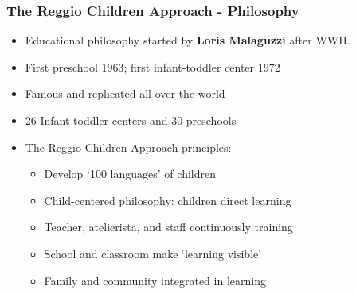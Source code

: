 \documentclass{beamer}
\begin{document}
\begin{frame}
\frametitle{The Reggio Children Approach - Philosophy}\label{frame:philosphy}
\begin{itemize}
	\item Educational philosophy started by \textbf{Loris Malaguzzi} after WWII.
	\item First preschool 1963; first infant-toddler center 1972 \hyperlink{fig:Num_Nidi}{}
	\item Famous and replicated all over the world \hyperlink{fig:World}{}
	\item 26 Infant-toddler centers and 30 preschools

	\vspace{2ex}


	\item The Reggio Children Approach principles:
		\begin{itemize}
		\item Develop `100 languages' of children
		\item Child-centered philosophy: children direct learning
		\item Teacher, atelierista, and staff continuously training
		\item School and classroom make `learning visible'
		\item Family and community integrated in learning
		\end{itemize} 
\end{itemize} 
\end{frame} 
\end{document}
